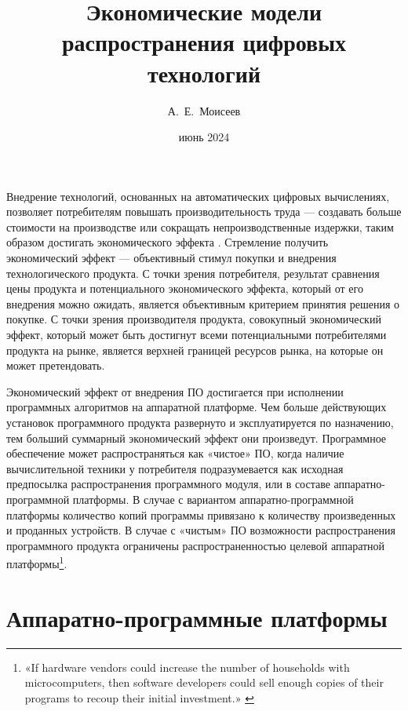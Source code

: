 \documentclass{article}
\title{Экономические модели распространения цифровых технологий}
\author{А.~Е.~Моисеев}
\date{июнь 2024}
\begin{document}
\maketitle

Внедрение технологий, основанных на автоматических цифровых вычислениях, позволяет потребителям повышать производительность труда — создавать больше стоимости на производстве или сокращать непроизводственные издержки, таким образом достигать экономического эффекта \cite{ecoEffects}. Стремление получить экономический эффект — объективный стимул покупки и внедрения технологического продукта. С точки зрения потребителя, результат сравнения цены продукта и потенциального экономического эффекта, который от его внедрения можно ожидать, является объективным критерием принятия решения о покупке. С точки зрения производителя продукта, совокупный экономический эффект, который может быть достигнут всеми потенциальными потребителями продукта на рынке, является верхней границей ресурсов рынка, на которые он может претендовать.

Экономический эффект от внедрения ПО достигается при исполнении программных алгоритмов на аппаратной платформе. Чем больше действующих установок программного продукта развернуто и эксплуатируется по назначению, тем больший суммарный экономический эффект они произведут. Программное обеспечение может распространяться как «чистое» ПО, когда наличие вычислительной техники у потребителя подразумевается как исходная предпосылка распространения программного модуля, или в составе аппаратно-программной платформы. В случае с вариантом аппаратно-программной платформы количество копий программы привязано к количеству произведенных и проданных устройств. В случае с «чистым» ПО возможности распространения программного продукта ограничены распространенностью целевой аппаратной платформы\footnote{«If hardware vendors could increase the number of households with microcomputers, then software developers could sell enough copies of their programs to recoup their initial investment.» \cite{driscollOpenLetter}}.

\section*{Аппаратно-программные платформы}
\end{document}
